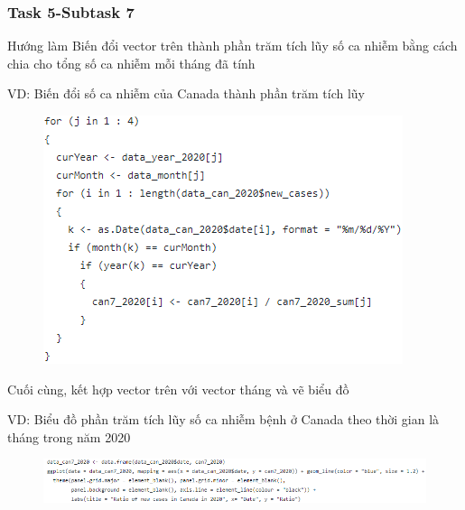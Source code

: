 \documentclass[english,10pt,table]{beamer}
\begin{document}
\frame
{
    \frametitle{Task 5-Subtask 7}
    \begin{block}{Hướng làm}
        	Biến đổi vector trên thành phần trăm tích lũy số ca nhiễm bằng cách chia cho tổng số ca nhiễm mỗi tháng đã tính
	
    VD: Biến đổi số ca nhiễm của Canada thành phần trăm tích lũy
            \begin{figure}[H]
				\centering
				\includegraphics[scale=0.2]{images/5.0.6.png}
			\end{figure}
	Cuối cùng, kết hợp vector trên với vector tháng và vẽ biểu đồ 
	
	VD: Biểu đồ phần trăm tích lũy số ca nhiễm bệnh ở Canada theo thời gian là tháng trong năm 2020
	        \begin{figure}[H]
				\centering
				\includegraphics[scale=0.2]{images/5.0.7.png}
			\end{figure}
    \end{block}
}
\frame
\end{document}
